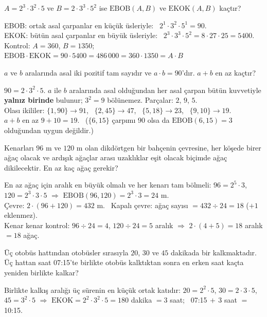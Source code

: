 \begin{alistirma}
\(A=2^3\cdot 3^2\cdot 5\) ve \(B=2\cdot 3^3\cdot 5^2\) ise \(\text{EBOB}(A,B)\) ve \(\text{EKOK}(A,B)\) kaçtır?
\end{alistirma}
\begin{cozum}
EBOB: ortak asal çarpanlar en küçük üsleriyle: \ \(2^{1}\cdot 3^{2}\cdot 5^{1}=90\).\\
EKOK: bütün asal çarpanlar en büyük üsleriyle: \ \(2^{3}\cdot 3^{3}\cdot 5^{2}=8\cdot 27\cdot 25=5400\).\\
Kontrol: \(A=360\), \(B=1350\); \ \(\text{EBOB}\cdot\text{EKOK}=90\cdot 5400=486\,000=360\cdot 1350=A\cdot B\) \checkmark
\end{cozum}

\begin{alistirma}
\(a\) ve \(b\) aralarında asal iki pozitif tam sayıdır ve \(a\cdot b=90\)'dır. \(a+b\) en az kaçtır?
\end{alistirma}
\begin{cozum}
\(90=2\cdot 3^2\cdot 5\). \(a\) ile \(b\) aralarında asal olduğundan her asal çarpan bütün kuvvetiyle \textbf{yalnız birinde} bulunur; \(3^2=9\) bölünemez. Parçalar: \(2\), \(9\), \(5\).\\
Olası ikililer: \(\{1,90\}\to 91\), \ \(\{2,45\}\to 47\), \ \(\{5,18\}\to 23\), \ \(\{9,10\}\to 19\).\\
\(a+b\) en az \(9+10=19\). \ (\(\{6,15\}\) çarpımı \(90\) olsa da \(\text{EBOB}(6,15)=3\) olduğundan uygun değildir.)
\end{cozum}

\begin{alistirma}
Kenarları \(96\) m ve \(120\) m olan dikdörtgen bir bahçenin çevresine, her köşede birer ağaç olacak ve ardışık ağaçlar arası uzaklıklar eşit olacak biçimde ağaç dikilecektir. En az kaç ağaç gerekir?
\end{alistirma}
\begin{cozum}
En az ağaç için aralık en büyük olmalı ve her kenarı tam bölmeli: \(96=2^5\cdot 3\), \(120=2^3\cdot 3\cdot 5\) \(\Rightarrow\) \(\text{EBOB}(96,120)=2^3\cdot 3=24\) m.\\
Çevre: \(2\cdot(96+120)=432\) m. \ Kapalı çevre: ağaç sayısı \(=432\div 24=18\) (\(+1\) eklenmez).\\
Kenar kenar kontrol: \(96\div 24=4\), \(120\div 24=5\) aralık \(\Rightarrow\) \(2\cdot(4+5)=18\) aralık \(=18\) ağaç.
\end{cozum}

\begin{alistirma}
Üç otobüs hattından otobüsler sırasıyla \(20\), \(30\) ve \(45\) dakikada bir kalkmaktadır. Üç hattan saat 07{:}15'te birlikte otobüs kalktıktan sonra en erken saat kaçta yeniden birlikte kalkar?
\end{alistirma}
\begin{cozum}
Birlikte kalkış aralığı üç sürenin en küçük ortak katıdır:
\(20=2^2\cdot 5\), \(30=2\cdot 3\cdot 5\), \(45=3^2\cdot 5\) \(\Rightarrow\) \(\text{EKOK}=2^2\cdot 3^2\cdot 5=180\) dakika \(=3\) saat; \ 07{:}15\(\,+\,3\) saat \(=\) 10{:}15.
\end{cozum}

